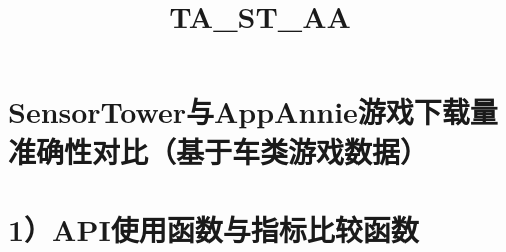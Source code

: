 \documentclass[11pt]{article}
\title{TA\_ST\_AA}
\begin{document}
    
    
    \maketitle
    
    

    
    \section{SensorTower与AppAnnie游戏下载量准确性对比（基于车类游戏数据）}\label{sensortowerux4e0eappannieux6e38ux620fux4e0bux8f7dux91cfux51c6ux786eux6027ux5bf9ux6bd4ux57faux4e8eux8f66ux7c7bux6e38ux620fux6570ux636e}

\section{1）API使用函数与指标比较函数}\label{apiux4f7fux7528ux51fdux6570ux4e0eux6307ux6807ux6bd4ux8f83ux51fdux6570}
\end{document}
